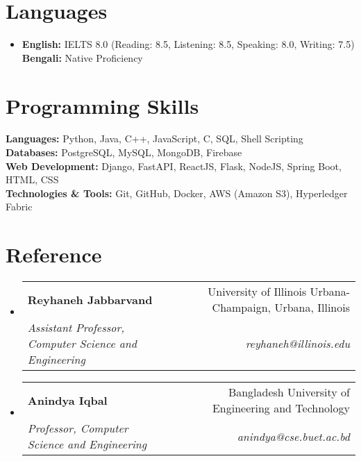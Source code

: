 \documentclass[letterpaper,12pt]{article} %
\makeatletter
\newcommand{\resumeSubheading}[4]{
  \vspace{-2pt}\item
    \begin{tabular*}{0.97\textwidth}[t]{l@{\extracolsep{\fill}}r}
      \textbf{#1} & #2 \\
      \textit{\small#3} & \textit{\small #4} \\
    \end{tabular*}\vspace{-7pt}
}
\newcommand{\resumeSubHeadingListStart}{\begin{itemize}[leftmargin=0.15in, label={}]}
\newcommand{\resumeSubHeadingListEnd}{\end{itemize}}
\makeatother
\begin{document}
\section{Languages}
\begin{itemize}[leftmargin=0.15in, label={}]
    \item \textbf{English:}  IELTS 8.0 (Reading: 8.5, Listening: 8.5, Speaking: 8.0, Writing: 7.5)\\
    \textbf{Bengali:} Native Proficiency
\end{itemize}

\section{Programming Skills}
\color[HTML]{1C033C}\textbf{Languages:} Python, Java, C++, JavaScript, C, SQL, Shell Scripting\\[3pt]
\color[HTML]{1C033C}\textbf{Databases:} PostgreSQL, MySQL, MongoDB, Firebase\\[3pt]
\color[HTML]{1C033C}\textbf{Web Development:} Django, FastAPI, ReactJS, Flask, NodeJS, Spring Boot, HTML, CSS\\[3pt]
\color[HTML]{1C033C}\textbf{Technologies \& Tools:} Git, GitHub, Docker, AWS (Amazon S3), Hyperledger Fabric
\section{Reference}
\resumeSubHeadingListStart
    \resumeSubheading
        {Reyhaneh Jabbarvand}{University of Illinois Urbana-Champaign, Urbana, Illinois}
        {Assistant Professor, Computer Science and Engineering}{reyhaneh@illinois.edu}
    \resumeSubheading
        {Anindya Iqbal}{Bangladesh University of Engineering and Technology}
        {Professor, Computer Science and Engineering}{anindya@cse.buet.ac.bd}
\resumeSubHeadingListEnd
\end{document}
